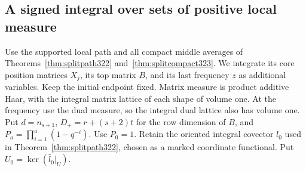 \documentclass[a4paper,11pt]{article}
\theoremstyle{definition}
\theoremstyle{remark}
\numberwithin{equation}{section}
\begin{document}
\subsection{A signed integral over sets of positive local measure}\label{nav:IX-68}
Use the supported local path and all compact middle averages
of Theorems~\ref{thm:splitpath322} and~\ref{thm:splitcompact323}.
We integrate its core position matrices \(X_j\), its top
matrix \(B\), and its last frequency \(z\) as additional
variables. Keep the initial endpoint fixed. Matrix measure
is product additive Haar, with the integral matrix lattice
of each shape of volume one. At the frequency use the dual
measure, so the integral dual lattice also has volume one.
Put \(d=n_{s+1}\), \(D_+=r+(s+2)t\) for the row dimension
of \(B\), and \(P_a=\prod_{i=1}^a(1-q^{-i})\). Use \(P_0=1\).
Retain the oriented integral covector \(l_0\) used in
Theorem~\ref{thm:splitpath322}, chosen as a marked coordinate
functional. Put \(U_0=\ker(\bar l_0|_U)\).
\end{document}
